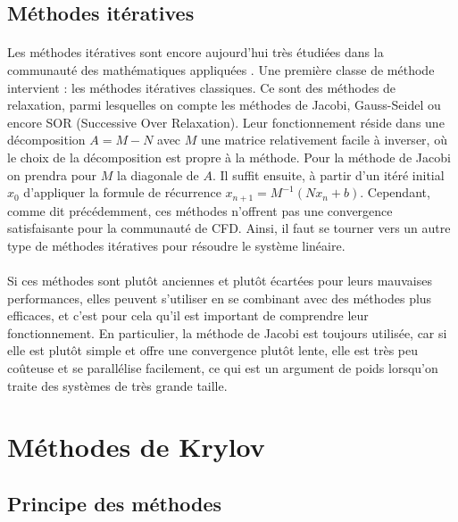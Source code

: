 	\subsection{Méthodes itératives}

		\paragraph{}
		Les méthodes itératives sont encore aujourd'hui très étudiées dans la communauté des mathématiques appliquées \cite{OlshanskiiTyrtyshnikov2014, Saad2003, TrefethenBau1997}.
		Une première classe de méthode intervient : les méthodes itératives classiques.
		Ce sont des méthodes de relaxation, parmi lesquelles on compte les méthodes de Jacobi, Gauss-Seidel ou encore SOR (Successive Over Relaxation).
		Leur fonctionnement réside dans une décomposition $A = M - N$ avec $M$ une matrice relativement facile à inverser, où le choix de la décomposition est propre à la méthode.
		Pour la méthode de Jacobi on prendra pour $M$ la diagonale de $A$.
		Il suffit ensuite, à partir d'un itéré initial $x_0$ d'appliquer la formule de récurrence $x_{n+1} = M^{-1}\left(Nx_n + b\right)$.
		Cependant, comme dit précédemment, ces méthodes n'offrent pas une convergence satisfaisante pour la communauté de CFD.
		Ainsi, il faut se tourner vers un autre type de méthodes itératives pour résoudre le système linéaire.

		\paragraph{}
		Si ces méthodes sont plutôt anciennes et plutôt écartées pour leurs mauvaises performances, elles peuvent s'utiliser en se combinant avec des 	méthodes plus efficaces, et c'est pour cela qu'il est important de comprendre leur fonctionnement.
		En particulier, la méthode de Jacobi est toujours utilisée, car si elle est plutôt simple et offre une convergence plutôt lente, elle est très peu coûteuse et se parallélise facilement, ce qui est un argument de poids lorsqu'on traite des systèmes de très grande taille.


\section{Méthodes de Krylov}

  \subsection{Principe des méthodes}


